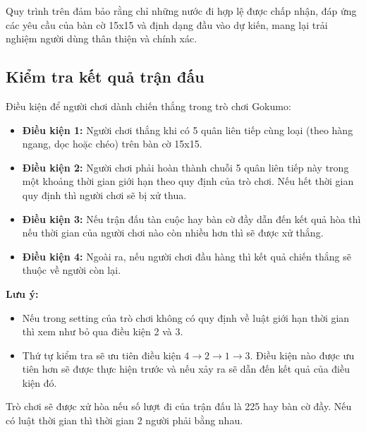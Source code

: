 Quy trình trên đảm bảo rằng chỉ những nước đi hợp lệ được chấp nhận, đáp ứng các yêu cầu của bàn cờ 15x15 và định dạng đầu vào dự kiến, mang lại trải nghiệm người dùng thân thiện và chính xác.

\subsection{Kiểm tra kết quả trận đấu}
Điều kiện để người chơi dành chiến thắng trong trò chơi Gokumo:
\begin{itemize}
    \item \textbf{Điều kiện 1:} Người chơi thắng khi có 5 quân liên tiếp cùng loại (theo hàng ngang, dọc hoặc chéo) trên bàn cờ 15x15.
    \item \textbf{Điều kiện 2:} Người chơi phải hoàn thành chuỗi 5 quân liên tiếp này trong một khoảng thời gian giới hạn theo quy định của trò chơi. Nếu hết thời gian quy định thì người chơi sẽ bị xử thua.
    \item \textbf{Điều kiện 3:} Nếu trận đấu tàn cuộc hay bàn cờ đầy dẫn đến kết quả hòa thì nếu thời gian của người chơi nào còn nhiều hơn thì sẽ được xử thắng.
    \item \textbf{Điều kiện 4:} Ngoài ra, nếu người chơi đầu hàng thì kết quả chiến thắng sẽ thuộc về người còn lại.  
\end{itemize}

\textbf{Lưu ý:} 
\begin{itemize}
\item Nếu trong setting của trò chơi không có quy định về luật giới hạn thời gian thì xem như bỏ qua điều kiện 2 và 3.

\item Thứ tự kiểm tra sẽ ưu tiên điều kiện \(4 \rightarrow 2 \rightarrow 1 \rightarrow 3\). Điều kiện nào được ưu tiên hơn sẽ được thực hiện trước và nếu xảy ra sẽ dẫn đến kết quả của điều kiện đó.
\end{itemize}

Trò chơi sẽ được xử hòa nếu số lượt đi của trận đấu là 225 hay bàn cờ đầy. Nếu có luật thời gian thì thời gian 2 người phải bằng nhau.


